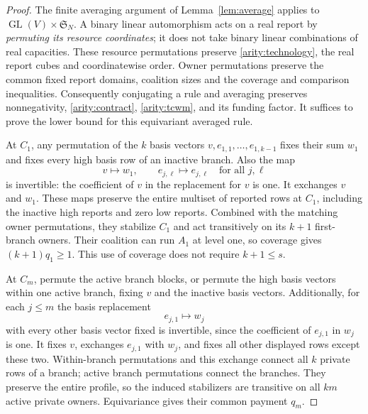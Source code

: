 \documentclass[11pt]{article}
\theoremstyle{definition}\newtheorem{definition}[theorem]{Definition}
\theoremstyle{remark}\newtheorem{remark}[theorem]{Remark}
\begin{document}
\begin{proof}
The finite averaging argument of Lemma~\ref{lem:average} applies to
$\operatorname{GL}(V)\times\mathfrak S_N$.  A binary linear automorphism
acts on a real report by \emph{permuting its resource coordinates}; it does
not take binary linear combinations of real capacities.  These resource
permutations preserve \eqref{arity:technology}, the real report cubes and
coordinatewise order.  Owner permutations preserve the common fixed report
domains, coalition sizes and the coverage and comparison inequalities.
Consequently conjugating a rule and averaging preserves nonnegativity,
\eqref{arity:contract}, \eqref{arity:tcwm}, and its funding factor.  It
suffices to prove the lower bound for this equivariant averaged rule.

At $C_1$, any permutation of the $k$ basis vectors
$v,e_{1,1},\ldots,e_{1,k-1}$ fixes their sum $w_1$ and fixes every high
basis row of an inactive branch.  Also the map
\[
  v\longmapsto w_1,\qquad e_{j,\ell}\longmapsto e_{j,\ell}
       \quad\text{for all }j,\ell
\]
is invertible: the coefficient of $v$ in the replacement for $v$ is one.
It exchanges $v$ and $w_1$.  These maps preserve the entire multiset of
reported rows at $C_1$, including the inactive high reports and zero low
reports.  Combined with the matching owner permutations, they stabilize
$C_1$ and act transitively on its $k+1$ first-branch owners.  Their coalition
can run $A_1$ at level one, so coverage gives $(k+1)q_1\geq1$.  This use of
coverage does not require $k+1\leq s$.

At $C_m$, permute the active branch blocks, or permute the high basis vectors
within one active branch, fixing $v$ and the inactive basis vectors.
Additionally, for each $j\leq m$ the basis replacement
\[
  e_{j,1}\longmapsto w_j
\]
with every other basis vector fixed is invertible, since the coefficient of
$e_{j,1}$ in $w_j$ is one.  It fixes $v$, exchanges $e_{j,1}$ with $w_j$,
and fixes all other displayed rows except these two.  Within-branch
permutations and this exchange connect all $k$ private rows of a branch;
active branch permutations connect the branches.  They preserve the entire
profile, so the induced stabilizers are transitive on all $km$ active
private owners.  Equivariance gives their common payment $q_m$.
\end{proof}
\end{document}
